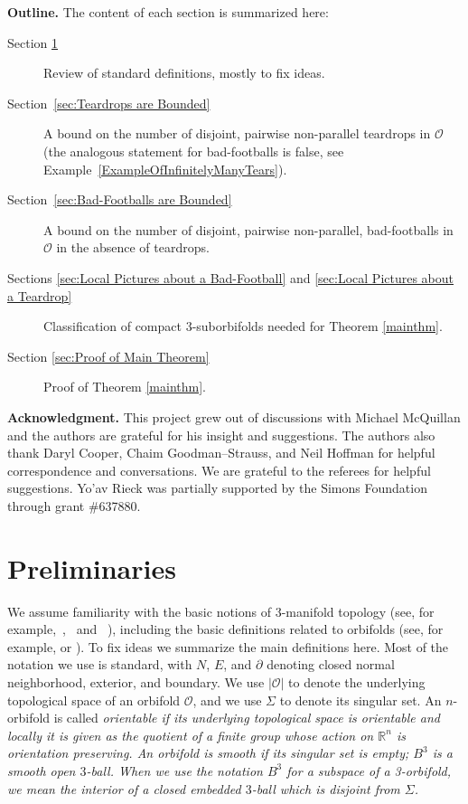 \documentclass[12pt,reqno]{amsart}
\theoremstyle{plain}
\theoremstyle{definition}
\numberwithin{subcase}{case}
\theoremstyle{plain}
\theoremstyle{definition}
\newcommand{\OO}{\mathcal{O}}
\begin{document}
\noindent
\textbf{Outline.} The content of each section is summarized here:
\begin{description}
\item[Section \ref{sec:Preliminaries}] Review of standard definitions, mostly to fix ideas. 
\item[Section~\ref{sec:Teardrops are Bounded}] A bound on the number of disjoint, pairwise non-parallel teardrops in $\OO$ (the analogous statement for bad-footballs is false, see Example~\ref{ExampleOfInfinitelyManyTears}).
\item[Section~\ref{sec:Bad-Footballs are Bounded}] A bound on the number of disjoint, pairwise non-parallel, bad-footballs in $\OO$ in the absence of teardrops. 
\item[Sections \ref{sec:Local Pictures about a Bad-Football} and \ref{sec:Local Pictures about a Teardrop}] Classification of compact 3-suborbifolds needed for Theorem \ref{mainthm}. 
\item[Section \ref{sec:Proof of Main Theorem}] Proof of Theorem \ref{mainthm}.
\end{description}

\noindent
\textbf{Acknowledgment.} This project grew out of discussions with Michael McQuillan and the authors are grateful for his insight and suggestions. The authors also thank Daryl Cooper, Chaim Goodman--Strauss, and Neil Hoffman for helpful correspondence and conversations.  We are grateful to the referees for helpful suggestions. Yo'av Rieck was partially supported by the Simons Foundation through grant \#637880.


\section{Preliminaries}\label{sec:Preliminaries}

\noindent
We assume familiarity with the basic notions of 3-manifold topology (see, for example,~\cite{hempel},~\cite{jaco} and ~\cite{schultens}), including the basic definitions related to orbifolds (see, for example, \cite{cooper} or \cite{boileau}). To fix ideas we summarize the main definitions here.  
Most of the notation we use is standard, with \(N\), \(E\), and \(\partial\) denoting closed normal neighborhood, exterior, and boundary. 
We use \(| \OO|\) to denote the underlying topological space of an orbifold \(\OO\), and we use \(\Sigma\) to denote its singular set.  An \(n\)-orbifold is called \em orientable \em if its underlying topological space is orientable and locally it is given as the quotient of a finite group whose action on \(\mathbb{R}^{n}\) is orientation preserving.  An orbifold is \em smooth \em if its singular set is empty; \(B^{3}\) is a smooth open \(3\)-ball. 
\ifDraft
When we use the notation \(B^{3}\) for a subspace of a 3-orbifold, we mean the interior of a closed embedded \(3\)-ball which is disjoint from \(\Sigma\).\fi
\end{document}
